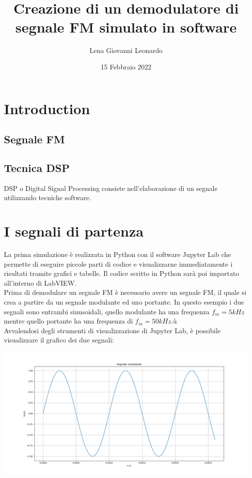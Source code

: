 \documentclass{article}
\title{Creazione di un demodulatore di segnale FM simulato in software}
\author{Lena Giovanni Leonardo}
\date{15 Febbraio 2022}
\begin{document}
\maketitle

\section{Introduction}

\subsection{Segnale FM}

\subsection{Tecnica DSP}
DSP o Digital Signal Processing consiste nell'elaborazione di un segnale utilizzando tecniche software.

\section{I segnali di partenza}
La prima simulazione è realizzata in Python con il software Jupyter Lab che permette di eseguire piccole parti di codice e visualizzarne immediatamente i risultati tramite grafici e tabelle. Il codice scritto in Python sarà poi importato all'interno di LabVIEW.
\\
Prima di demodulare un segnale FM è necessario avere un segnale FM, il quale si crea a partire da un segnale modulante ed uno portante. In questo esempio i due segnali sono entrambi sinusoidali, quello modulante ha una frequenza $f_m = 5 kHz$ mentre quello portante ha una frequenza di $f_m = 50 kHz$.ù
\\
Avvalendosi degli strumenti di visualizzazione di Jupyter Lab, è possibile visualizzare il grafico dei due segnali:
\\
\begin{center}
    \includegraphics[width=\textwidth]{modulante.png}
\end{center}
\end{document}
